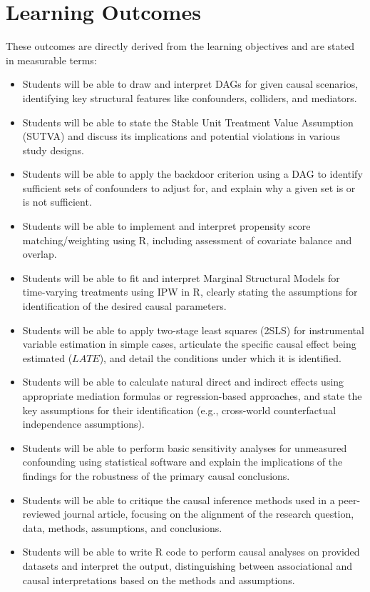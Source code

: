 \documentclass[10.5pt]{article}
\begin{document}
\section{Learning Outcomes}
These outcomes are directly derived from the learning objectives and are stated in measurable terms:
\begin{itemize}
    \item Students will be able to draw and interpret DAGs for given causal scenarios, identifying key structural features like confounders, colliders, and mediators.
    \item Students will be able to state the Stable Unit Treatment Value Assumption (SUTVA) and discuss its implications and potential violations in various study designs.
    \item Students will be able to apply the backdoor criterion using a DAG to identify sufficient sets of confounders to adjust for, and explain why a given set is or is not sufficient.
    \item Students will be able to implement and interpret propensity score matching/weighting using R, including assessment of covariate balance and overlap.
    \item Students will be able to fit and interpret Marginal Structural Models for time-varying treatments using IPW in R, clearly stating the assumptions for identification of the desired causal parameters.
    \item Students will be able to apply two-stage least squares (2SLS) for instrumental variable estimation in simple cases, articulate the specific causal effect being estimated ($LATE$), and detail the conditions under which it is identified.
    \item Students will be able to calculate natural direct and indirect effects using appropriate mediation formulas or regression-based approaches, and state the key assumptions for their identification (e.g., cross-world counterfactual independence assumptions).
    \item Students will be able to perform basic sensitivity analyses for unmeasured confounding using statistical software and explain the implications of the findings for the robustness of the primary causal conclusions.
    \item Students will be able to critique the causal inference methods used in a peer-reviewed journal article, focusing on the alignment of the research question, data, methods, assumptions, and conclusions.
    \item Students will be able to write R code to perform causal analyses on provided datasets and interpret the output, distinguishing between associational and causal interpretations based on the methods and assumptions.
\end{itemize}
\end{document}
